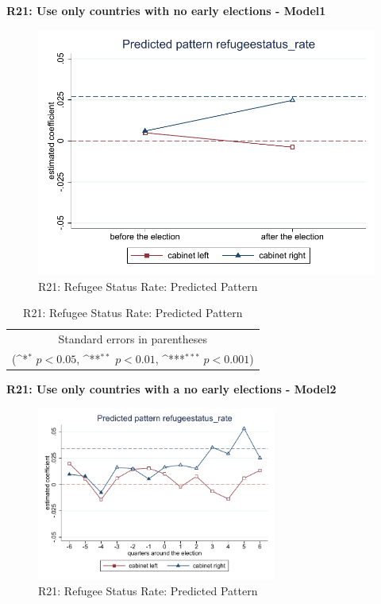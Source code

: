 \documentclass[10pt,a4paper]{scrartcl}
\begin{document}
\clearpage
\textbf{R21: Use only countries with no early elections - Model1}
\begin{figure}[!ht]
	\centering
	\includegraphics[width=1\textwidth]{figures_edited/refugeestatus_rate_graph1_R21.pdf}
	\caption{R21: Refugee Status Rate: Predicted Pattern}
\end{figure}

\begin{table}[!ht]\centering
	\renewcommand{\arraystretch}{1.25}
	\def\sym#1{\ifmmode^{#1}\else\(^{#1}\)\fi}
	\caption{R21: Refugee Status Rate: Predicted Pattern}
	\begin{tabular}{l*{2}{c}}
		\hline\hline
		
		\hline\hline
		\multicolumn{3}{c}{\footnotesize Standard errors in parentheses} \\
		\multicolumn{3}{c}{\footnotesize (\sym{*} \(p<0.05\), \sym{**} \(p<0.01\), \sym{***} \(p<0.001\))}\\
	\end{tabular}
\end{table}

\clearpage
\textbf{R21: Use only countries with a no early elections - Model2}
\begin{figure}[!ht]
	\centering
	\includegraphics[width=0.7\textwidth]{figures_edited/refugeestatus_rate_graph2_R21.pdf}
	\caption{R21: Refugee Status Rate: Predicted Pattern}
\end{figure}
\end{document}
